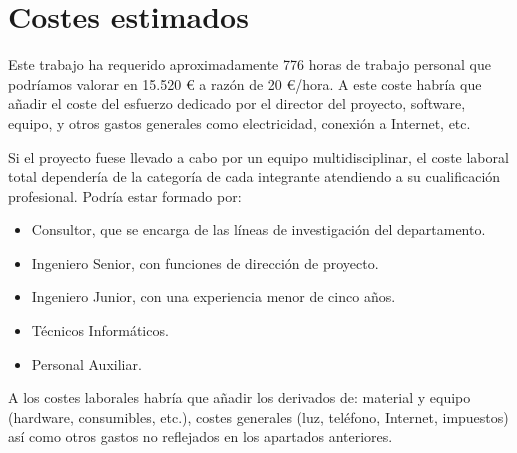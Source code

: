 \section {Costes estimados}

Este trabajo ha requerido aproximadamente 776 horas de trabajo personal que
podríamos valorar en 15.520 € a razón de 20 €/hora. A este coste habría que añadir el coste del esfuerzo dedicado por el director del proyecto, software, equipo, y otros gastos generales como electricidad, conexión a Internet, etc.

Si el proyecto fuese llevado a cabo por un equipo multidisciplinar, el coste laboral total dependería de la categoría de cada integrante atendiendo a su cualificación profesional. Podría estar formado por:
\begin{itemize}
\item Consultor, que se encarga de las líneas de investigación del
departamento.
\item Ingeniero Senior, con funciones de dirección de proyecto.
\item Ingeniero Junior, con una experiencia menor de cinco años.
\item Técnicos Informáticos.
\item Personal Auxiliar.
\end{itemize}

A los costes laborales habría que añadir los derivados de: material y equipo (hardware, consumibles, etc.), costes generales (luz, teléfono, Internet, impuestos) así como otros gastos no reflejados en los apartados anteriores.

